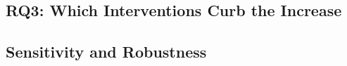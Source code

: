 \subsection{RQ3: Which Interventions Curb the Increase}
\label{sec:results-rq3}

%

\subsection{Sensitivity and Robustness}
\label{sec:results-robustness}

